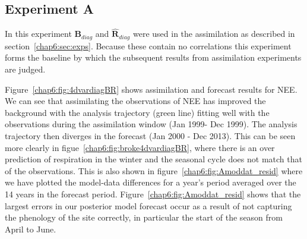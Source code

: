 \subsection{Experiment A} \label{chap6:sec:expa}
In this experiment $\textbf{B}_{diag}$ and $\hat{\textbf{R}}_{diag}$ were used in the assimilation as described in section~\ref{chap6:sec:exps}. Because these contain no correlations this experiment forms the baseline by which the subsequent results from assimilation experiments are judged.  

Figure~\ref{chap6:fig:4dvardiagBR} shows assimilation and forecast results for NEE. We can see that assimilating the observations of NEE has improved the background with the analysis trajectory (green line) fitting well with the observations during the assimilation window (Jan 1999- Dec 1999). The analysis trajectory then diverges in the forecast (Jan 2000 - Dec 2013). This can be seen more clearly in figue~\ref{chap6:fig:broke4dvardiagBR}, where there is an over prediction of respiration in the winter and the seasonal cycle does not match that of the observations. This is also shown in figure~\ref{chap6:fig:Amoddat_resid} where we have plotted the model-data differences for a year's period averaged over the 14 years in the forecast period. Figure~\ref{chap6:fig:Amoddat_resid} shows that the largest errors in our posterior model forecast occur as a result of not capturing the phenology of the site correctly, in particular the start of the season from April to June.
 
